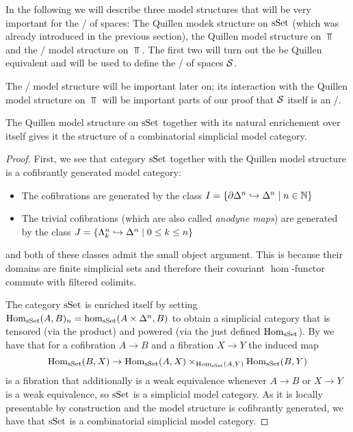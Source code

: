 In the following we will describe three model structures that will be very important for the \inftycat/ of spaces: The Quillen modek structure on $\operatorname{sSet}$ (which was already introduced in the previous section), the Quillen model structure on $\Top$ and the \Strom/ model structure on $\Top$.
The first two will turn out the be Quillen equivalent and will be used to define the \inftycat/ of spaces $\mathcal{S}$.

The \Strom/ model structure will be important later on; its interaction with the Quillen model structure on $\Top$ will be important parts of our proof that $\mathcal{S}$ itself is an \inftytop/.
\begin{prop}\label{prop:sSetCombSimpModelStructure}
    The Quillen model structure on $\operatorname{sSet}$ together with its natural enrichement over itself gives it the structure of a combinatorial simplicial model category.
    \begin{proof}
        First, we see that category $\operatorname{sSet}$ together with the Quillen model structure is a cofibrantly generated model category:
    \begin{itemize}
        \item The cofibrations are generated by the class $I=\left\lbrace\partial\Delta^n\hookrightarrow \Delta^n\mid n\in\mathbb{N}\right\rbrace$
        \item The trivial cofibrations (which are also called \emph{anodyne maps}) are generated by the class $J=\left\lbrace\Lambda_k^n\hookrightarrow\Delta^n\mid 0\leq k\leq n\right\rbrace$
    \end{itemize}
    and both of these classes admit the small object argument.
    This is because their domains are finite simplicial sets and therefore their covariant $\hom$-functor commute with filtered colimits.

    The category $\operatorname{sSet}$ is enriched itself by setting $\operatorname{Hom}_{\operatorname{sSet}}(A,B)_n=\hom_{\operatorname{sSet}}(A\times\Delta^n,B)$ to obtain a simplicial category that is tensored (via the product) and powered (via the just defined $\operatorname{Hom}_{\operatorname{sSet}}$).
    By %
    we have that for a cofibration $A\to B$ and a fibration $X\to Y$ the induced map 
    \begin{equation*}
        \operatorname{Hom}_{\operatorname{sSet}}(B,X)\to\operatorname{Hom}_{\operatorname{sSet}}(A,X)\times_{\operatorname{Hom}_{\operatorname{sSet}}(A,Y)}\operatorname{Hom}_{\operatorname{sSet}}(B,Y)
    \end{equation*}
    is a fibration that additionally is a weak equivalence whenever $A\to B$ or $X\to Y$ is a weak equivalence, so $\operatorname{sSet}$ is a simplicial model category.
    As it is locally presentable by construction and the model structure is cofibrantly generated, we have that $\operatorname{sSet}$ is a combinatorial simplicial model category.
    \end{proof}
\end{prop}
